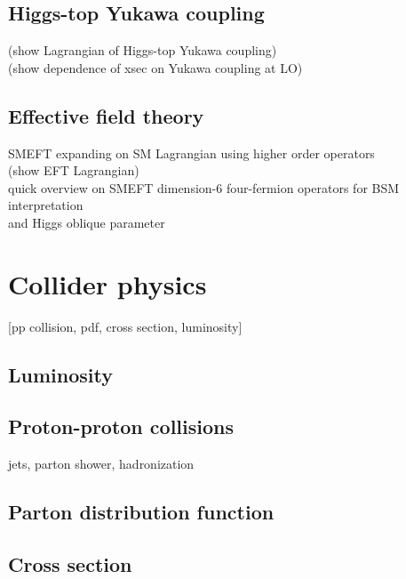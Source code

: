 \documentclass[../thesis.tex]{subfiles}
\begin{document}
\subsection*{Higgs-top Yukawa coupling}
(show Lagrangian of Higgs-top Yukawa coupling)\\
(show dependence of \tttt xsec on Yukawa coupling at LO)
\subsection*{Effective field theory}
SMEFT expanding on SM Lagrangian using higher order operators\\
(show EFT Lagrangian)\\
quick overview on SMEFT dimension-6 four-fermion operators for BSM interpretation\\
and Higgs oblique parameter

\section{Collider physics}
[pp collision, pdf, cross section, luminosity]
\subsection*{Luminosity}
\subsection*{Proton-proton collisions}
jets, parton shower, hadronization
\subsection*{Parton distribution function}
\subsection*{Cross section}
\end{document}
